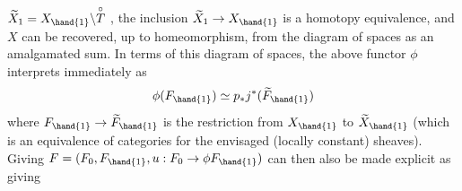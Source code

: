 $\widetilde{X}_1 = X_{\hand{1}}\backslash\overset{\circ}{T}$ , the inclusion $\widetilde{X}_1 \to X_{\hand{1}}$ is a homotopy equivalence, and $X$ can
be recovered, up to homeomorphism, from the diagram of spaces
as an amalgamated sum. In terms of this diagram of spaces, the above functor
$\phi$ interprets immediately as
\[ \phi(F_{\hand{1}}) \simeq p_* j^*(\widetilde{F}_{\hand{1}}) \]
where $F_{\hand{1}} \to \widetilde{F}_{\hand{1}}$ is the restriction from $X_{\hand{1}}$ to $\widetilde{X}_{\hand{1}}$ (which is an equivalence
of categories for the envisaged (locally constant) sheaves). Giving
$F = (F_0 , F_{\hand{1}} , u : F_0 \to \phi F_{\hand{1}})$ can then also be made explicit as giving

